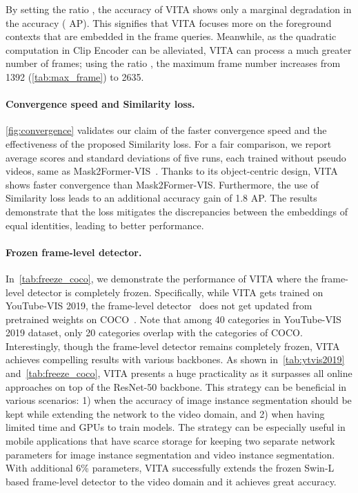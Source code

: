 \documentclass{article}
\begin{document}
By setting the ratio , the accuracy of VITA shows only a marginal degradation in the accuracy ( AP).
This signifies that VITA focuses more on the foreground contexts that are embedded in the frame queries.
Meanwhile, as the quadratic computation in Clip Encoder can be alleviated, VITA can process a much greater number of frames; using the ratio , the maximum frame number increases from 1392 (\cref{tab:max_frame}) to 2635.

\paragraph{Convergence speed and Similarity loss.}
\cref{fig:convergence} validates our claim of the faster convergence speed and the effectiveness of the proposed Similarity loss.
For a fair comparison, we report average scores and standard deviations of five runs, each trained without pseudo videos, same as Mask2Former-VIS~\cite{Mask2Former-VIS}.
Thanks to its object-centric design, VITA shows faster convergence than Mask2Former-VIS.
Furthermore, the use of Similarity loss leads to an additional accuracy gain of 1.8 AP.
The results demonstrate that the loss mitigates the discrepancies between the embeddings of equal identities, leading to better performance.


\paragraph{Frozen frame-level detector.}
In~\cref{tab:freeze_coco}, we demonstrate the performance of VITA where the frame-level detector is completely frozen.
Specifically, while VITA gets trained on YouTube-VIS 2019, the frame-level detector~\cite{Mask2Former} does not get updated from pretrained weights on COCO~\cite{COCO}.
Note that among 40 categories in YouTube-VIS 2019 dataset, only 20 categories overlap with the categories of COCO.
Interestingly, though the frame-level detector remains completely frozen, VITA achieves compelling results with various backbones.
As shown in~\cref{tab:ytvis2019} and~\cref{tab:freeze_coco}, VITA presents a huge practicality as it surpasses all online approaches on top of the ResNet-50 backbone.
This strategy can be beneficial in various scenarios: 1) when the accuracy of image instance segmentation should be kept while extending the network to the video domain, and 2) when having limited time and GPUs to train models.
The strategy can be especially useful in mobile applications that have scarce storage for keeping two separate network parameters for image instance segmentation and video instance segmentation.
With additional 6\% parameters, VITA successfully extends the frozen Swin-L based frame-level detector to the video domain and it achieves great accuracy.
\end{document}

